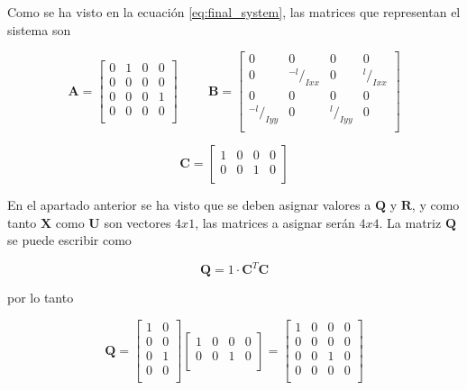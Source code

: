 \documentclass[twoside,11pt]{report}
\begin{document}
Como se ha visto en la ecuación \ref{eq:final_system}, las matrices que representan el sistema son

\begin{equation}
\pmb{A}= \left[ \begin{array}{cccc}
0 & 1 & 0 & 0 \\
0 & 0 & 0 & 0 \\
0 & 0 & 0 & 1 \\
0 & 0 & 0 & 0 \\ \end{array} \right] \hspace{1cm} \pmb{B}=\left[ \begin{array}{cccc}
0 & 0 & 0 & 0 \\
0 & {}^{-l}/_{Ixx} & 0 & {}^{l}/_{Ixx} \\ 
0 & 0 & 0 & 0 \\
{}^{-l}/_{Iyy} & 0 & {}^{l}/_{Iyy} & 0 \\ \end{array} \right] 
\end{equation} 

\begin{equation}
\nonumber
\pmb{C}=\left[ \begin{array}{cccc}
1 & 0 & 0 & 0 \\
0 & 0 & 1 & 0 \\ \end{array} \right] 
\end{equation} 

En el apartado anterior se ha visto que se deben asignar valores a $\mathbf{Q}$ y $\mathbf{R}$, y como tanto $\mathbf{X}$ como $\mathbf{U}$ son vectores $4x1$, las matrices a asignar serán $4x4$. La matriz $\mathbf{Q}$ se puede escribir como 

\begin{equation}
\mathbf{Q}=1 \cdot \pmb{C}^{T}\pmb{C}
\end{equation}

por lo tanto 

\begin{equation}
\mathbf{Q}= \left[ \begin{array}{cc}
1 & 0 \\
0 & 0 \\
0 & 1 \\
0 & 0 \\ \end{array} \right] \left[ \begin{array}{cccc}
1 & 0 & 0 & 0 \\
0 & 0 & 1 & 0 \\ \end{array} \right] = \left[ \begin{array}{cccc}
1 & 0 & 0 & 0 \\
0 & 0 & 0 & 0 \\
0 & 0 & 1 & 0 \\
0 & 0 & 0 & 0 \\ \end{array} \right]
\end{equation}
\end{document}
